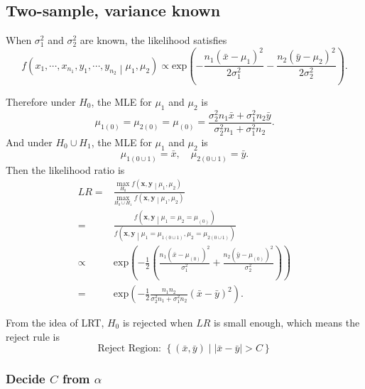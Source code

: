 \documentclass[a4paper,12pt]{article}
\begin{document}
\subsection{Two-sample, variance known}
\label{sec:two-sample-variance}
When $\sigma_1^2$ and $\sigma_2^2$ are known, the likelihood satisfies
\[
  f\left(x_1, \cdots, x_{n_1}, y_1, \cdots, y_{n_2}
    \middle|\mu_1, \mu_2\right)
  \propto
  \mathrm{exp}\left(
    -\frac{n_1\left(\bar{x} - \mu_1\right)^2}{2\sigma_1^2}
    -\frac{n_2\left(\bar{y} - \mu_2\right)^2}{2\sigma_2^2}
  \right)
  .
\]

Therefore under $H_0$, the MLE for $\mu_1$ and $\mu_2$ is
\[
  \mu_{1\left(0\right)} = \mu_{2\left(0\right)} = \mu_{\left(0\right)}
  = \frac{
    \sigma_2^2n_1\bar{x} + \sigma_1^2n_2\bar{y}
  }{
    \sigma_2^2n_1 + \sigma_1^2n_2
  }
  .
\]
And under $H_0\cup H_1$, the MLE for $\mu_1$ and $\mu_2$ is
\[
  \mu_{1\left(0\cup1\right)} = \bar{x}
  ,\quad
  \mu_{2\left(0\cup1\right)} = \bar{y}
  .
\]
Then the likelihood ratio is 
\[
  \begin{aligned}
    LR =& \frac{
      \underset{H_0}{\mathrm{max}}\;
      f\left(\bm{x}, \bm{y}\middle|\mu_1, \mu_2\right)
    }{
      \underset{H_0\cup H_1}{\mathrm{max}}\;
      f\left(\bm{x}, \bm{y}\middle|\mu_1, \mu_2\right)
    }    \\
    =& \frac{
      f\left(\bm{x}, \bm{y}\middle|\mu_1 = \mu_2 = \mu_{\left(0\right)}\right)
    }{
      f\left(\bm{x}, \bm{y}\middle|\mu_1 = \mu_{1\left(0\cup1\right)}, \mu_2 = \mu_{2\left(0\cup1\right)}\right)
    }    \\
    \propto&
    \mathrm{exp}\left(
      -\frac{1}{2}\left(
        \frac{n_1\left(\bar{x} - \mu_{\left(0\right)}\right)^2}{\sigma_1^2}
        +\frac{n_2\left(\bar{y} - \mu_{\left(0\right)}\right)^2}{\sigma_2^2}
      \right)
    \right)    \\
    =& \mathrm{exp}\left(
      -\frac{1}{2}
      \frac{n_1n_2}{\sigma_2^2n_1 + \sigma_1^2 n_2}
      \left(\bar{x} - \bar{y}\right)^2
    \right)
    .
  \end{aligned}
\]

From the idea of LRT, $H_0$ is rejected when $LR$ is small enough, which means the reject rule is
\[
  \text{Reject Region: }
  \left\{
    \left(\bar{x}, \bar{y}\right)
    \middle|
    \left|\bar{x} - \bar{y}\right| > C
  \right\}
\]

\subsubsection{Decide $C$ from $\alpha$}
\label{sec:decide-c-from-2}
\end{document}
